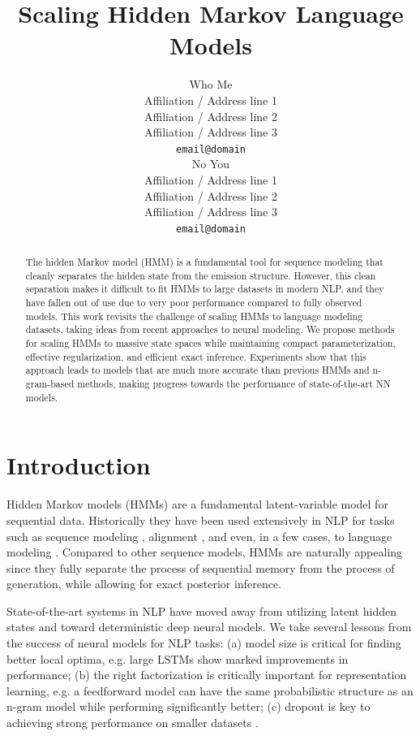 \documentclass[11pt,a4paper]{article}
\title{Scaling Hidden Markov Language Models}
\author{Who Me \\
  Affiliation / Address line 1 \\
  Affiliation / Address line 2 \\
  Affiliation / Address line 3 \\
  \texttt{email@domain} \\\And
  No You \\
  Affiliation / Address line 1 \\
  Affiliation / Address line 2 \\
  Affiliation / Address line 3 \\
  \texttt{email@domain} \\}
\date{}
\begin{document}
\maketitle
\begin{abstract}
The hidden Markov model (HMM) is a fundamental tool for sequence modeling that 
cleanly separates the hidden state from the emission structure.
However, this clean separation makes it difficult to fit HMMs to large datasets in modern NLP, 
and they have fallen out of use due to very poor performance 
compared to fully observed models. This work revisits the challenge of 
scaling HMMs to language modeling datasets, taking ideas from recent approaches to neural modeling.
We propose methods for scaling HMMs to massive state spaces
while maintaining compact parameterization,
effective regularization, and efficient exact inference.
Experiments show that this approach leads to models that are much more accurate
than previous HMMs and n-gram-based methods,
making progress towards the performance of state-of-the-art NN models. 
\end{abstract}

\section{Introduction}

Hidden Markov models (HMMs) are a fundamental latent-variable model for sequential data.
Historically they have been used extensively in NLP for tasks such as
sequence modeling \citep{rabiner1990tut}, alignment \citep{vogel1996hmm},
and even, in a few cases, to language modeling \citep{kuhn1994hmmlm,huang2011thesis}. 
Compared to other sequence models, HMMs are naturally appealing since they 
fully separate the process of sequential memory from the process of generation,
while allowing for exact posterior inference. 



State-of-the-art systems in NLP have moved away from utilizing latent hidden states
and toward deterministic deep neural models.
We take several lessons from the success of neural models for NLP tasks:
(a) model size is critical for finding better local optima,
e.g. large LSTMs \cite{zaremba2014lstm} show marked improvements in performance;
(b) the right factorization is critically important for representation learning,
e.g. a feedforward model \cite{bengio2003nlm}
can have the same probabilistic structure as an n-gram model while performing significantly better;
(c) dropout is key to achieving strong performance on smaller datasets \citep{zaremba2014lstm,merity2017awdlstm}.
\end{document}
